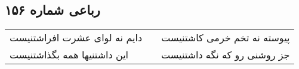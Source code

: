 \begin{center}
\section*{رباعی شماره ۱۵۶}
\label{sec:sh156}
\begin{longtable}{l p{0.5cm} r}
دایم نه لوای عشرت افراشتنیست
&&
پیوسته نه تخم خرمی کاشتنیست
\\
این داشتنیها همه بگذاشتنیست
&&
جز روشنی رو که نگه داشتنیست
\\
\end{longtable}
\end{center}
